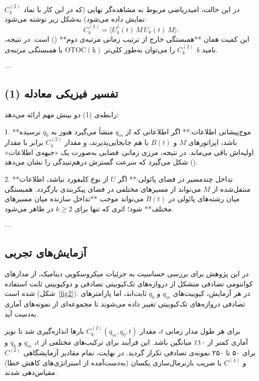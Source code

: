 در این حالت، امیدریاضی مربوط به مشاهده‌گر نهایی (که در این کار با نماد \( C^{(2)}_k \) نمایش داده می‌شود) به‌شکل زیر نوشته می‌شود:
\[
C^{(2)}_k = \langle U_k^\dagger(t)\, M\, U_k(t)\, M \rangle.
\tag{1}
\]
این کمیت همان **همبستگی خارج از ترتیب زمانی مرتبه‌ی دوم** () است. در نتیجه، \( C^{(2)}_k \) را می‌توان به‌طور کلی‌تر \(\mathrm{OTOC(k)}\) یا \textit{همبستگی مرتبه‌ی k} نامید.

---

\subsection{تفسیر فیزیکی معادله (1)}

رابطه‌ی (1) دو بینش مهم ارائه می‌دهد:

1. **موج‌پیشانی اطلاعات:**  
اگر اطلاعاتی که از \( q_m \) منشأ می‌گیرد هنوز به \( q_b \) نرسیده باشد، اپراتورهای \( M \) و \( B(t) \) با هم جابجایی‌پذیرند، و مقدار \( C^{(2)}_k \) برابر با مقدار اولیه‌اش باقی می‌ماند.  
در نتیجه، مرزی زمانی–فضایی به‌صورت یک «جبهه‌ی اطلاعات» () شکل می‌گیرد که سرعت گسترش درهم‌تنیدگی را نشان می‌دهد.

2. **تداخل چندمسیر در فضای پائولی:**  
اگر \( U \) از نوع کلیفورد نباشد، اطلاعات منتقل‌شده از \( M \) می‌تواند از مسیرهای مختلفی در فضای پیکربندی بازگردد. همبستگی میان رشته‌های پائولی در \( B(t) \) می‌تواند موجب **تداخل سازنده میان مسیرهای مختلف** شود؛ اثری که تنها برای \( k \ge 2 \) در  ظاهر می‌شود.

---

\subsection{آزمایش‌های تجربی}

در این پژوهش برای بررسی حساسیت  به جزئیات میکروسکوپی دینامیک، از مدارهای کوانتومی تصادفی متشکل از دروازه‌های تک‌کیوبیتی تصادفی و دوکیوبیتی ثابت استفاده شده است (شکل~\ref{fig2}).  
در هر آزمایش، کیوبیت‌های \( q_m \) و \( q_b \) ثابت‌اند، اما پارامترهای تصادفی دروازه‌های تک‌کیوبیتی تغییر داده می‌شوند تا مجموعه‌ای از نمونه‌های آماری به‌دست آید.

برای هر طول مدار زمانی \( t \)، مقدار \( C^{(2)}_k(q_m, q_b, t) \) بارها اندازه‌گیری شد تا نویز آماری کمتر از ۱۰٪ میانگین باشد.  
این فرآیند برای ترکیب‌های مختلفی از \( t \)، \( q_m \) و \( q_b \) و برای ۵۰ تا ۲۵۰ نمونه‌ی تصادفی تکرار گردید.  
در نهایت، تمام مقادیر آزمایشگاهی \( C^{(2)} \) و \( C^{(4)} \) با ضریب بازنرمال‌سازی یکسان (به‌دست‌آمده از استراتژی‌های کاهش خطا) مقیاس‌دهی شدند.

